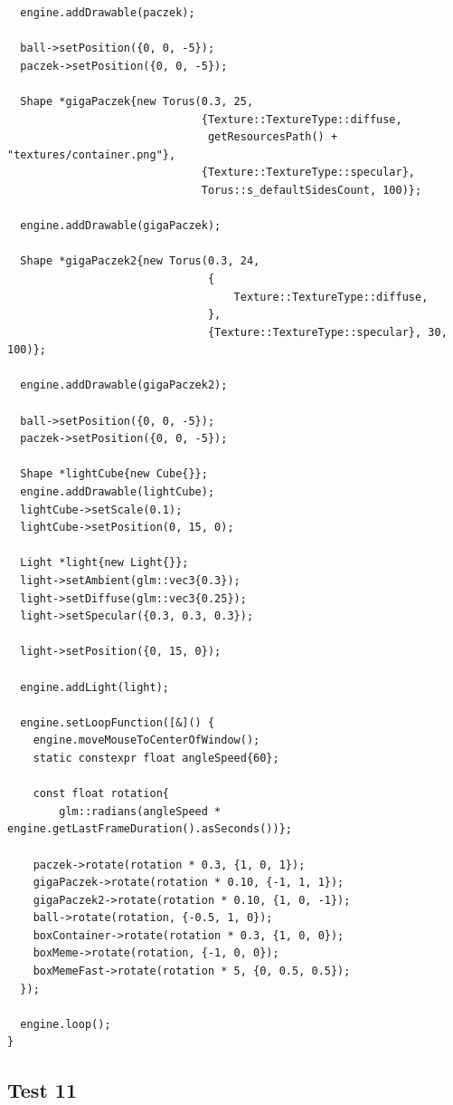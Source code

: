 \documentclass[11pt]{article}
\begin{document}
\begin{verbatim}
  engine.addDrawable(paczek);

  ball->setPosition({0, 0, -5});
  paczek->setPosition({0, 0, -5});

  Shape *gigaPaczek{new Torus(0.3, 25,
                              {Texture::TextureType::diffuse,
                               getResourcesPath() + "textures/container.png"},
                              {Texture::TextureType::specular},
                              Torus::s_defaultSidesCount, 100)};

  engine.addDrawable(gigaPaczek);

  Shape *gigaPaczek2{new Torus(0.3, 24,
                               {
                                   Texture::TextureType::diffuse,
                               },
                               {Texture::TextureType::specular}, 30, 100)};

  engine.addDrawable(gigaPaczek2);

  ball->setPosition({0, 0, -5});
  paczek->setPosition({0, 0, -5});

  Shape *lightCube{new Cube{}};
  engine.addDrawable(lightCube);
  lightCube->setScale(0.1);
  lightCube->setPosition(0, 15, 0);

  Light *light{new Light{}};
  light->setAmbient(glm::vec3{0.3});
  light->setDiffuse(glm::vec3{0.25});
  light->setSpecular({0.3, 0.3, 0.3});

  light->setPosition({0, 15, 0});

  engine.addLight(light);

  engine.setLoopFunction([&]() {
    engine.moveMouseToCenterOfWindow();
    static constexpr float angleSpeed{60};

    const float rotation{
        glm::radians(angleSpeed * engine.getLastFrameDuration().asSeconds())};

    paczek->rotate(rotation * 0.3, {1, 0, 1});
    gigaPaczek->rotate(rotation * 0.10, {-1, 1, 1});
    gigaPaczek2->rotate(rotation * 0.10, {1, 0, -1});
    ball->rotate(rotation, {-0.5, 1, 0});
    boxContainer->rotate(rotation * 0.3, {1, 0, 0});
    boxMeme->rotate(rotation, {-1, 0, 0});
    boxMemeFast->rotate(rotation * 5, {0, 0.5, 0.5});
  });

  engine.loop();
}
\end{verbatim}
\subsection{Test 11}
\label{sec:orgd35187e}
\end{document}
